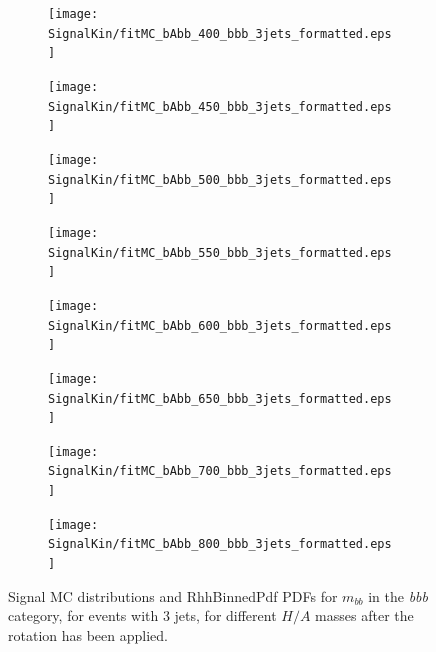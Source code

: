 



\begin{figure}[phtb!]
  \begin{center}
  \begin{subfigure}[$m_{A}=400$ GeV]{0.4\textwidth}\texttt{[image: SignalKin/fitMC\_bAbb\_400\_bbb\_3jets\_formatted.eps]}\end{subfigure}
  \begin{subfigure}[$m_{A}=450$ GeV]{0.4\textwidth}\texttt{[image: SignalKin/fitMC\_bAbb\_450\_bbb\_3jets\_formatted.eps]}\end{subfigure}
  \begin{subfigure}[$m_{A}=500$ GeV]{0.4\textwidth}\texttt{[image: SignalKin/fitMC\_bAbb\_500\_bbb\_3jets\_formatted.eps]}\end{subfigure}
  \begin{subfigure}[$m_{A}=550$ GeV]{0.4\textwidth}\texttt{[image: SignalKin/fitMC\_bAbb\_550\_bbb\_3jets\_formatted.eps]}\end{subfigure}
  \begin{subfigure}[$m_{A}=600$ GeV]{0.4\textwidth}\texttt{[image: SignalKin/fitMC\_bAbb\_600\_bbb\_3jets\_formatted.eps]}\end{subfigure}
  \begin{subfigure}[$m_{A}=650$ GeV]{0.4\textwidth}\texttt{[image: SignalKin/fitMC\_bAbb\_650\_bbb\_3jets\_formatted.eps]}\end{subfigure}
  \begin{subfigure}[$m_{A}=700$ GeV]{0.4\textwidth}\texttt{[image: SignalKin/fitMC\_bAbb\_700\_bbb\_3jets\_formatted.eps]}\end{subfigure}
  \begin{subfigure}[$m_{A}=800$ GeV]{0.4\textwidth}\texttt{[image: SignalKin/fitMC\_bAbb\_800\_bbb\_3jets\_formatted.eps]}\end{subfigure}
  \caption{Signal MC distributions and RhhBinnedPdf PDFs for $m_{bb}$ in the {\it bbb} category, for events with 3 jets, for different $H/A$ masses after the rotation has been applied.\label{fig:signalPDFs_3j_bbb}} 
    \end{center}
\end{figure}


